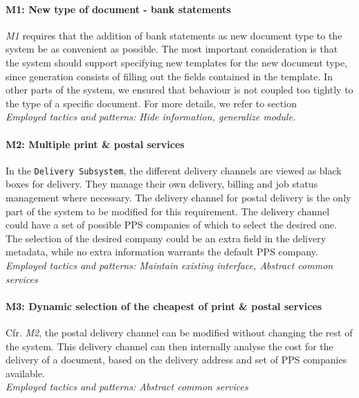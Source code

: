 \paragraph{M1: New type of document - bank statements} \emph{M1} requires that the addition of bank statements as new document type to the system be as convenient as possible. The most important consideration is that the system should support specifying new templates for the new document type, since generation consists of filling out the fields contained in the template. In other parts of the system, we ensured that behaviour is not coupled too tightly to the type of a specific document. For more details, we refer to section \\
\emph{Employed tactics and patterns: Hide information, generalize module.}
    
\paragraph{M2: Multiple print \& postal services} 
In the \texttt{Delivery Subsystem}, the different delivery channels are viewed as black boxes for delivery. They manage their own delivery, billing and job status management where necessary. The delivery channel for postal delivery is the only part of the system to be modified for this requirement. The delivery channel could have a set of possible PPS companies of which to select the desired one. The selection of the desired company could be an extra field in the delivery metadata, while no extra information warrants the default PPS company.\\
\emph{Employed tactics and patterns: Maintain existing interface, Abstract common services}
    
\paragraph{M3: Dynamic selection of the cheapest of print \& postal services}
Cfr. \emph{M2}, the postal delivery channel can be modified without changing the rest of the system. This delivery channel can then internally analyse the cost for the delivery of a document, based on the delivery address and set of PPS companies available.\\
\emph{Employed tactics and patterns: Abstract common services}

